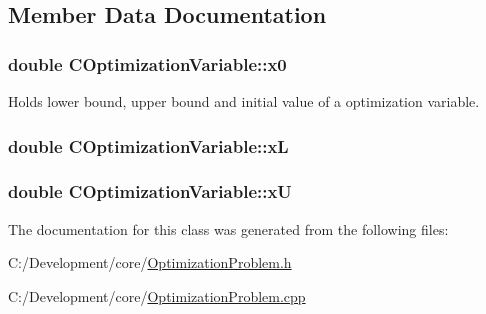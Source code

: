 \subsection{Member Data Documentation}
\hypertarget{class_c_optimization_variable_af67ef7c2faf37cb193309c7a540aee31}{
\subsubsection[{x0}]{\setlength{\rightskip}{0pt plus 5cm}double C\-Optimization\-Variable\-::x0\hspace{0.3cm}{\ttfamily [protected]}}}\label{class_c_optimization_variable_af67ef7c2faf37cb193309c7a540aee31}
Holds lower bound, upper bound and initial value of a optimization variable. \hypertarget{class_c_optimization_variable_a64d40e05e5a9832e0e2aaebdbd105365}{
\subsubsection[{x\-L}]{\setlength{\rightskip}{0pt plus 5cm}double C\-Optimization\-Variable\-::x\-L\hspace{0.3cm}{\ttfamily [protected]}}}\label{class_c_optimization_variable_a64d40e05e5a9832e0e2aaebdbd105365}
\hypertarget{class_c_optimization_variable_a549a16352636f3ec68729d197823716d}{
\subsubsection[{x\-U}]{\setlength{\rightskip}{0pt plus 5cm}double C\-Optimization\-Variable\-::x\-U\hspace{0.3cm}{\ttfamily [protected]}}}\label{class_c_optimization_variable_a549a16352636f3ec68729d197823716d}


The documentation for this class was generated from the following files\-:\begin{DoxyCompactItemize}
\item 
C\-:/\-Development/core/\hyperlink{_optimization_problem_8h}{Optimization\-Problem.\-h}\item 
C\-:/\-Development/core/\hyperlink{_optimization_problem_8cpp}{Optimization\-Problem.\-cpp}\end{DoxyCompactItemize}
